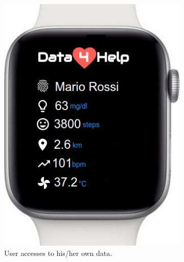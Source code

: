 \begin{figure}[ht]
  \centering
  \begin{subfigure}[ht]{0.38\linewidth}
    \addtocounter{subfigure}{8}  
    \includegraphics[width=\linewidth]{images/Mock-up/Wearable.png}
    \caption{User accesses to his/her own data.}
  \end{subfigure} \hfil \hfil \hfil
  \begin{subfigure}[ht]{0.38\linewidth}

\end{subfigure}
\end{figure}
